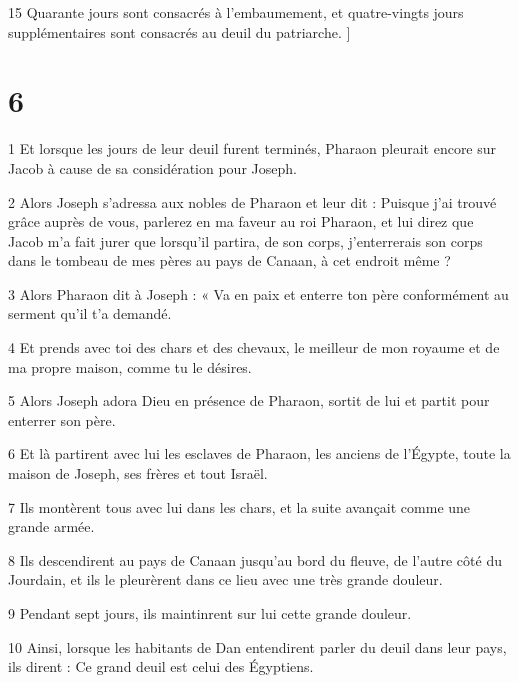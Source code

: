 \par 15 Quarante jours sont consacrés à l'embaumement, et quatre-vingts jours supplémentaires sont consacrés au deuil du patriarche. ]

\chapter{6}

\par 1 Et lorsque les jours de leur deuil furent terminés, Pharaon pleurait encore sur Jacob à cause de sa considération pour Joseph.

\par 2 Alors Joseph s'adressa aux nobles de Pharaon et leur dit : Puisque j'ai trouvé grâce auprès de vous, parlerez en ma faveur au roi Pharaon, et lui direz que Jacob m'a fait jurer que lorsqu'il partira, de son corps, j'enterrerais son corps dans le tombeau de mes pères au pays de Canaan, à cet endroit même ?

\par 3 Alors Pharaon dit à Joseph : « Va en paix et enterre ton père conformément au serment qu'il t'a demandé.

\par 4 Et prends avec toi des chars et des chevaux, le meilleur de mon royaume et de ma propre maison, comme tu le désires.

\par 5 Alors Joseph adora Dieu en présence de Pharaon, sortit de lui et partit pour enterrer son père.

\par 6 Et là partirent avec lui les esclaves de Pharaon, les anciens de l'Égypte, toute la maison de Joseph, ses frères et tout Israël.

\par 7 Ils montèrent tous avec lui dans les chars, et la suite avançait comme une grande armée.

\par 8 Ils descendirent au pays de Canaan jusqu'au bord du fleuve, de l'autre côté du Jourdain, et ils le pleurèrent dans ce lieu avec une très grande douleur.

\par 9 Pendant sept jours, ils maintinrent sur lui cette grande douleur.

\par 10 Ainsi, lorsque les habitants de Dan entendirent parler du deuil dans leur pays, ils dirent : Ce grand deuil est celui des Égyptiens.

